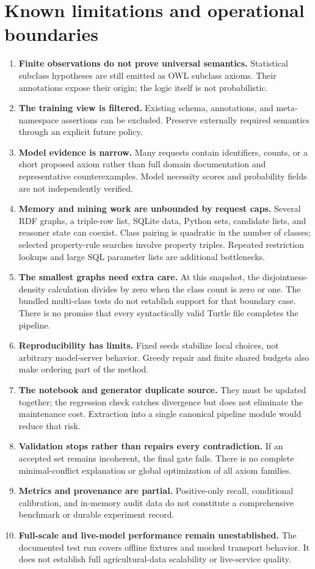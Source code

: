 \documentclass[11pt,a4paper]{article}
\begin{document}
\section{Known limitations and operational boundaries}\label{sec:limits}

\begin{enumerate}
\item \textbf{Finite observations do not prove universal semantics.}
Statistical subclass hypotheses are still emitted as OWL subclass axioms. Their
annotations expose their origin; the logic itself is not probabilistic.
\item \textbf{The training view is filtered.}
Existing schema, annotations, and meta-namespace assertions can be excluded.
Preserve externally required semantics through an explicit future policy.
\item \textbf{Model evidence is narrow.}
Many requests contain identifiers, counts, or a short proposed axiom rather
than full domain documentation and representative counterexamples. Model
necessity scores and probability fields are not independently verified.
\item \textbf{Memory and mining work are unbounded by request caps.}
Several RDF graphs, a triple-row list, SQLite data, Python sets, candidate lists,
and reasoner state can coexist. Class pairing is quadratic in the number of
classes; selected property-rule searches involve property triples. Repeated
restriction lookups and large SQL parameter lists are additional bottlenecks.
\item \textbf{The smallest graphs need extra care.}
At this snapshot, the disjointness-density calculation divides by zero when the
class count is zero or one. The bundled multi-class tests do not establish
support for that boundary case. There is no promise that every syntactically
valid Turtle file completes the pipeline.
\item \textbf{Reproducibility has limits.}
Fixed seeds stabilize local choices, not arbitrary model-server behavior.
Greedy repair and finite shared budgets also make ordering part of the method.
\item \textbf{The notebook and generator duplicate source.}
They must be updated together; the regression check catches divergence but does
not eliminate the maintenance cost. Extraction into a single canonical pipeline
module would reduce that risk.
\item \textbf{Validation stops rather than repairs every contradiction.}
If an accepted set remains incoherent, the final gate fails. There is no complete
minimal-conflict explanation or global optimization of all axiom families.
\item \textbf{Metrics and provenance are partial.}
Positive-only recall, conditional calibration, and in-memory audit data do not
constitute a comprehensive benchmark or durable experiment record.
\item \textbf{Full-scale and live-model performance remain unestablished.}
The documented test run covers offline fixtures and mocked transport behavior.
It does not establish full agricultural-data scalability or live-service quality.
\end{enumerate}
\end{document}
